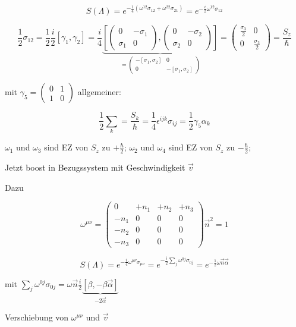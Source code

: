 \[S(\Lambda) = e^{-\frac{1}{4}(\omega^{12}\sigma_{12}+\omega^{22}\sigma_{21})}= e^{-\frac{i}{2}\omega^{12}\sigma_{12}}\]

\[\frac{1}{2}\sigma_{12} = \frac{1}{2}\frac{i}{2}[\gamma_1,\gamma_2] = \frac{i}{4}\underbrace{\left[ \begin{pmatrix} 0&-\sigma_1\\   \sigma_1&0 \end{pmatrix}, \begin{pmatrix} 0&-\sigma_2\\   \sigma_2&0 \end{pmatrix} \right]}_{=  \begin{pmatrix} -[\sigma_1,\sigma_2]&0\\  0&- [\sigma_1,\sigma_2] \end{pmatrix}  } =  \begin{pmatrix} \frac{\sigma_3}{2}&0\\0& \frac{\sigma_3}{2} \end{pmatrix} = \frac{S_z}{\hbar} \]


mit \(\gamma_5 = \begin{pmatrix} 0&1\\   1&0 \end{pmatrix} \) allgemeiner:

\[\frac{1}{2}\sum_k = \frac{S_k}{\hbar} = \frac{1}{4} \epsilon^{ijk}\sigma_{ij} = \frac{1}{2} \gamma_5\alpha_k\]

\(\omega_1\) und \(\omega_3\) sind EZ von \(S_z\) zu \(+\frac{\hbar}{2}\); \(\omega_2\) und \(\omega_4\) sind EZ von \(S_z\) zu \(-\frac{\hbar}{2}\);

Jetzt boost in Bezugssystem mit Geschwindigkeit \(\vec v\)

Dazu

\[\omega^{\mu\nu}   =\begin{pmatrix} 0&+n_1&+n_2&+n_3\\  -n_1&0&0&0\\   -n_2&0&0&0\\  -n_3&0&0&0 \end{pmatrix}\vec n^2 = 1 \]

\[ S(\Lambda) = e^{-\frac{i}{4}\omega^{\mu\nu}\sigma_{\mu\nu}}  = e^{-\frac{i}{2}\sum_j\omega^{0j}\sigma_{0j}} = e^{-\frac{1}{2}\omega \vec n\vec \alpha}  \]

mit \( \sum_j\omega^{0j}\sigma_{0j} = \omega \vec n \frac{i}{2}\underbrace{[\beta,-\beta\vec\alpha]}_{-2\vec\alpha} \)

Verschiebung von \(\omega^{\mu\nu}\) und \(\vec v\)


